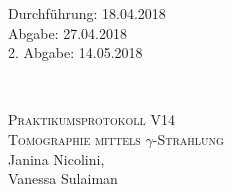 



\begin{titlepage}
  \begin{flushleft}
 Durchführung: 18.04.2018\\
 Abgabe: 27.04.2018\\
 2. Abgabe: 14.05.2018
  \end{flushleft}


\HRule\\[1,0cm]

 \begin{center}


\textsc{\LARGE Praktikumsprotokoll V14}\\[1.5cm]
\textsc{\huge Tomographie mittels $\gamma$-Strahlung} \\[5,5cm]

Janina Nicolini\footnotemark[1], \\
Vanessa Sulaiman\footnotemark[2] \\[1,0cm]



 \end{center}
\HRule

 \vfill

\end{titlepage}






\printbibliography



